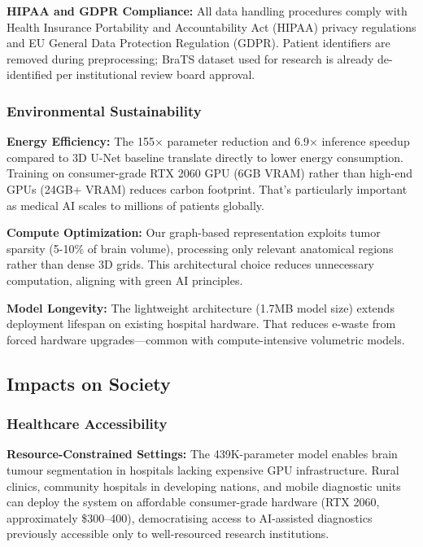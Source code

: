 \textbf{HIPAA and GDPR Compliance:} All data handling procedures comply with Health Insurance Portability and Accountability Act (HIPAA) privacy regulations and EU General Data Protection Regulation (GDPR). Patient identifiers are removed during preprocessing; BraTS dataset used for research is already de-identified per institutional review board approval.

\subsubsection{Environmental Sustainability}

\textbf{Energy Efficiency:} The 155$\times$ parameter reduction and 6.9$\times$ inference speedup compared to 3D U-Net baseline translate directly to lower energy consumption. Training on consumer-grade RTX 2060 GPU (6GB VRAM) rather than high-end GPUs (24GB+ VRAM) reduces carbon footprint. That's particularly important as medical AI scales to millions of patients globally.

\textbf{Compute Optimization:} Our graph-based representation exploits tumor sparsity (5-10\% of brain volume), processing only relevant anatomical regions rather than dense 3D grids. This architectural choice reduces unnecessary computation, aligning with green AI principles.

\textbf{Model Longevity:} The lightweight architecture (1.7MB model size) extends deployment lifespan on existing hospital hardware. That reduces e-waste from forced hardware upgrades—common with compute-intensive volumetric models.


\subsection{Impacts on Society}

\subsubsection{Healthcare Accessibility}

\textbf{Resource-Constrained Settings:} The 439K-parameter model enables brain tumour segmentation in hospitals lacking expensive GPU infrastructure. Rural clinics, community hospitals in developing nations, and mobile diagnostic units can deploy the system on affordable consumer-grade hardware (RTX 2060, approximately \$300--400), democratising access to AI-assisted diagnostics previously accessible only to well-resourced research institutions.

